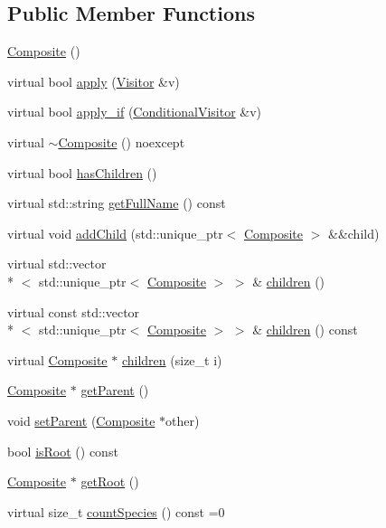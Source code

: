 \subsection*{Public Member Functions}
\begin{DoxyCompactItemize}
\item 
\hyperlink{classchem_1_1Composite_ae3444220cf51ab3db2616ea4833c4770}{Composite} ()
\item 
virtual bool \hyperlink{classchem_1_1Composite_a455876eca36c9648f209f4bcf4dbcd61}{apply} (\hyperlink{classchem_1_1Visitor}{Visitor} \&v)
\item 
virtual bool \hyperlink{classchem_1_1Composite_a6acf2bf4e2c14d6e9bfe40d15c3318fb}{apply\-\_\-if} (\hyperlink{classchem_1_1ConditionalVisitor}{Conditional\-Visitor} \&v)
\item 
virtual \hyperlink{classchem_1_1Composite_a36a86821952d10911595120d3d26d683}{$\sim$\-Composite} () noexcept
\item 
virtual bool \hyperlink{classchem_1_1Composite_aa73520e07d39cc47662953f54ee1d1a7}{has\-Children} ()
\item 
virtual std\-::string \hyperlink{classchem_1_1Composite_a7781095451c19c48996856153c29bf6b}{get\-Full\-Name} () const 
\item 
virtual void \hyperlink{classchem_1_1Composite_a03f3ca2662b3920f369b4538eef08c50}{add\-Child} (std\-::unique\-\_\-ptr$<$ \hyperlink{classchem_1_1Composite}{Composite} $>$ \&\&child)
\item 
virtual std\-::vector\\*
$<$ std\-::unique\-\_\-ptr$<$ \hyperlink{classchem_1_1Composite}{Composite} $>$ $>$ \& \hyperlink{classchem_1_1Composite_a6671b998c10b78401c82e671a0cab713}{children} ()
\item 
virtual const std\-::vector\\*
$<$ std\-::unique\-\_\-ptr$<$ \hyperlink{classchem_1_1Composite}{Composite} $>$ $>$ \& \hyperlink{classchem_1_1Composite_aa75e96e37ccd077f09fde7c307108e2b}{children} () const 
\item 
virtual \hyperlink{classchem_1_1Composite}{Composite} $\ast$ \hyperlink{classchem_1_1Composite_a0e9373e9cc8135413b10610464f4b036}{children} (size\-\_\-t i)
\item 
\hyperlink{classchem_1_1Composite}{Composite} $\ast$ \hyperlink{classchem_1_1Component_a32812270ee52f07ceae2194c56864fd6}{get\-Parent} ()
\item 
void \hyperlink{classchem_1_1Component_a1f4e4d1566f1d3026f1e2a14fa3dffd9}{set\-Parent} (\hyperlink{classchem_1_1Composite}{Composite} $\ast$other)
\item 
bool \hyperlink{classchem_1_1Component_a75cd13a0d884f82fcddd574de33fbfe6}{is\-Root} () const 
\item 
\hyperlink{classchem_1_1Composite}{Composite} $\ast$ \hyperlink{classchem_1_1Component_a7f1166f8fb4c9526cd1794ec3c2714f5}{get\-Root} ()
\item 
virtual size\-\_\-t \hyperlink{classchem_1_1Component_ab39d0fd77db206513e03aee1c0aeb459}{count\-Species} () const =0
\end{DoxyCompactItemize}
